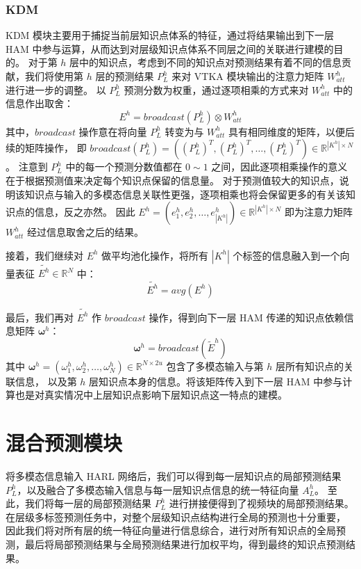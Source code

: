     \subsubsection{KDM}
    KDM 模块主要用于捕捉当前层知识点体系的特征，通过将结果输出到下一层 HAM 中参与运算，从而达到对层级知识点体系不同层之间的关联进行建模的目的。
    对于第 $h$ 层中的知识点，考虑到不同的知识点对预测结果有着不同的信息贡献，我们将使用第 $h$ 层的预测结果 $P_L^h$ 来对 VTKA 模块输出的注意力矩阵 $W_{att}^h$ 进行进一步的调整。
    以 $P_L^h$ 预测分数为权重，通过逐项相乘的方式来对 $W_{att}^h$ 中的信息作出取舍：
    \begin{equation}
        E^h = broadcast\left(P_L^h\right) \otimes W_{att}^h
    \end{equation}
    其中，$broadcast$ 操作意在将向量 $P_L^h$ 转变为与 $W_{att}^h$ 具有相同维度的矩阵，以便后续的矩阵操作，
    即 $broadcast\left(P_L^h\right) = \left(\left(P_L^h\right)^T, \left(P_L^h\right)^T, \dots, \left(P_L^h\right)^T\right) \in \mathbb{R}^{\left|K^h\right| \times N}$。
    注意到 $P_L^h$ 中的每一个预测分数值都在 $0 \sim 1$ 之间，因此逐项相乘操作的意义在于根据预测值来决定每个知识点保留的信息量。
    对于预测值较大的知识点，说明该知识点与输入的多模态信息关联性更强，逐项相乘也将会保留更多的有关该知识点的信息，反之亦然。
    因此 $E^h = (e_1^h, e_2^h, \dots, e_{\left|K^h\right|}^h) \in \mathbb{R}^{\left|K^h\right| \times N}$ 即为注意力矩阵 $W_{att}^h$ 经过信息取舍之后的结果。

    接着，我们继续对 $E^h$ 做平均池化操作，将所有 $\left|K^h\right|$ 个标签的信息融入到一个向量表征 $\tilde{E^h} \in \mathbb{R}^{N}$ 中：
    \begin{equation}
        \tilde{E^h} = avg(E^h)
    \end{equation}

    最后，我们再对 $\tilde{E^h}$ 作 $broadcast$ 操作，得到向下一层 HAM 传递的知识点依赖信息矩阵 $\boldsymbol{\omega}^h$：
    \begin{equation}
        \boldsymbol{\omega}^h = broadcast\left(\tilde{E}^h\right)
    \end{equation}
    其中 $\boldsymbol{\omega}^h = (\omega_1^h, \omega_2^h, \dots, \omega_N^h) \in \mathbb{R}^{N \times 2u}$ 包含了多模态输入与第 $h$ 层所有知识点的关联信息，
    以及第 $h$ 层知识点本身的信息。将该矩阵传入到下一层 HAM 中参与计算也是对真实情况中上层知识点影响下层知识点这一特点的建模。


\section{混合预测模块}
    将多模态信息输入 HARL 网络后，我们可以得到每一层知识点的局部预测结果 $P_L^h$，以及融合了多模态输入信息与每一层知识点信息的统一特征向量 $A_L^h$。
    至此，我们将每一层的局部预测结果 $P_L^h$ 进行拼接便得到了视频块的局部预测结果。
    在层级多标签预测任务中，对整个层级知识点结构进行全局的预测也十分重要，
    因此我们将对所有层的统一特征向量进行信息综合，进行对所有知识点的全局预测，最后将局部预测结果与全局预测结果进行加权平均，得到最终的知识点预测结果。

